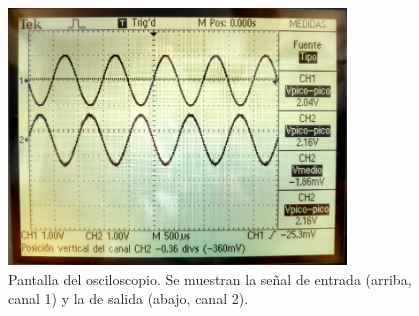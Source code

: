 \begin{figure}[H]
    \centering
    \includegraphics[width=0.8\textwidth]{img/1/osciloscopio-1.jpg}
    \caption{Pantalla del osciloscopio. Se muestran la señal de entrada
        (arriba, canal 1) y la de salida (abajo, canal 2).}
    \label{fig:1-datos:osciloscopio}
\end{figure}
